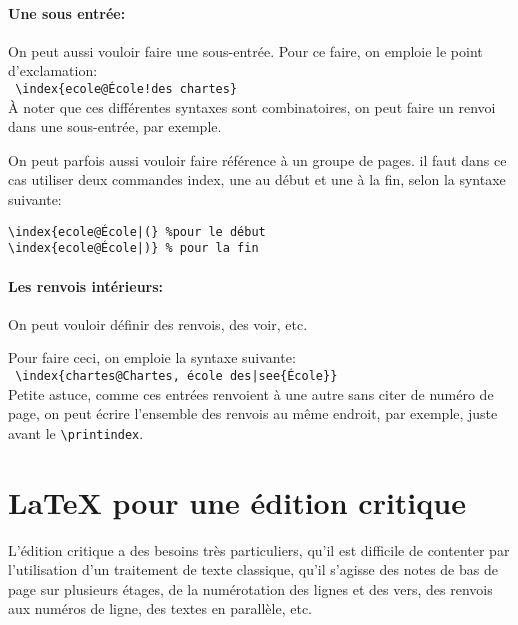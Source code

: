 \documentclass[a4paper,twoside,french,12pt]{book}
\begin{document}
\paragraph{Une sous entrée:} On peut aussi vouloir faire une sous-entrée. Pour ce faire, on emploie le point d'exclamation: \\
\verb= \index{ecole@École!des chartes}=\\

À noter que ces différentes syntaxes sont combinatoires, on peut faire un renvoi dans une sous-entrée, par exemple.

On peut parfois aussi vouloir faire référence à un groupe de pages. il faut dans ce cas utiliser deux commandes index, une au début et une à la fin, selon la syntaxe suivante:
\begin{verbatim}
\index{ecole@École|(} %pour le début
\index{ecole@École|)} % pour la fin
\end{verbatim}


\paragraph{Les renvois intérieurs:}
On peut vouloir définir des renvois, des \og voir\fg, etc.

Pour faire ceci, on emploie la syntaxe suivante:\\
\verb= \index{chartes@Chartes, école des|see{École}}=\\
Petite astuce, comme ces entrées renvoient à une autre sans citer de numéro de page, on peut écrire l'ensemble des renvois au même endroit, par exemple, juste avant le \verb=\printindex=.








\section{\LaTeX{} pour une édition critique}

L'édition critique a des besoins très particuliers, qu'il est difficile de contenter par l'utilisation d'un traitement de texte classique, qu'il s'agisse des notes de bas de page sur plusieurs étages, de la numérotation des lignes et des vers, des renvois aux numéros de ligne, des textes en parallèle, etc.
\end{document}
